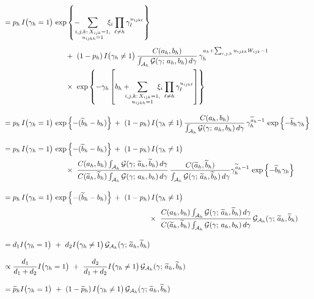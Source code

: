 \documentclass[11pt]{article}
\newcommand{\ind}{I}
\newcommand{\gammaExprUisOne}{ \hspace{3mm} \sum_{\mathclap{\substack{i,j,k{:}\, X_{ijk}=1, \\ u_{ijkh} = 1}}} \hspace{4mm} \xi_i \prod_{\ell \ne h} \gamma_\ell^{ u_{ijk\ell} } }
\begin{document}
\begin{enumerate}[label=Step \arabic*., leftmargin=13mm, itemsep=10mm]
\begin{align*}
&= p_h\, \ind\big( \gamma_h = 1 \big)\, \exp\left\{ -\gammaExprUisOne \right\} \\[1ex]
& \hspace{30mm} +~ (1 - p_h)\, \ind\big(\gamma_h \ne 1 \big)\, \frac{ C(a_h,b_h) }{ \int_{\mathcal{A}_h} \mathcal{G}(\gamma;\, a_h,b_h)\, d\gamma }\, \gamma_h^{ a_h + \sum_{i,j,k} u_{ijkh} W_{ijk} - 1 } \\
& \hspace{30mm} \times~ \exp\left\{ -\gamma_h \left[ b_h + \gammaExprUisOne  \right] \right\} \\[2ex]
&= p_h\, \ind\big( \gamma_h = 1 \big)\, \exp\left\{ -(\widetilde{b}_h - b_h) \right\} \,+~ (1 - p_h)\, \ind\big( \gamma_h \ne 1 \big)\, \frac{ C(a_h,b_h) }{ \int_{\mathcal{A}_h} \mathcal{G}(\gamma;\, a_h,b_h)\, d\gamma }\, \gamma_h^{ \widetilde{a}_h - 1 }\, \exp\left\{ -\widetilde{b}_h \gamma_h \right\} \\[2ex]
&= p_h\, \ind\big( \gamma_h = 1 \big)\, \exp\left\{ -(\widetilde{b}_h - b_h) \right\} \,+~ (1 - p_h)\, \ind\big( \gamma_h \ne 1 \big) \\
& \hspace{30mm} \times~ \frac{ C(a_h,b_h) \int_{\mathcal{A}_h} \mathcal{G}(\gamma;\, \widetilde{a}_h, \widetilde{b}_h)\, d\gamma }{ C(\widetilde{a}_h, \widetilde{b}_h) \int_{\mathcal{A}_h} \mathcal{G}(\gamma;\, a_h, b_h)\, d\gamma }\, \frac{ C( \widetilde{a}_h, \widetilde{b}_h) }{ \int_{\mathcal{A}_h} \mathcal{G}(\gamma;\, \widetilde{a}_h, \widetilde{b}_h)\, d\gamma } \gamma_h^{ \widetilde{a}_h - 1 }\, \exp\left\{ -\widetilde{b}_h \gamma_h \right\} \\[2ex]
&= p_h\, \ind\big( \gamma_h = 1 \big)\, \exp\left\{ -(\widetilde{b}_h - b_h) \right\} \,+~ (1 - p_h)\, \ind\big( \gamma_h \ne 1 \big)\, \\
& \hspace{70mm} \times~ \frac{ C(a_h,b_h) \int_{\mathcal{A}_h} \mathcal{G}(\gamma;\, \widetilde{a}_h, \widetilde{b}_h)\, d\gamma }{ C(\widetilde{a}_h, \widetilde{b}_h) \int_{\mathcal{A}_h} \mathcal{G}(\gamma;\, a_h, b_h)\, d\gamma }\, \mathcal{G}_{\mathcal{A}_h} (\gamma;\, \widetilde{a}_h, \widetilde{b}_h) \\[2ex]
&= d_1 \ind\big( \gamma_h = 1 \big) ~+~ d_2 \ind\big( \gamma_h \ne 1 \big)\, \mathcal{G}_{\mathcal{A}_h} (\gamma;\, \widetilde{a}_h, \widetilde{b}_h) \\[2ex]
&\propto \frac{ d_1 }{ d_1 + d_2 } \ind\big( \gamma_h = 1 \big) ~+~ \frac{ d_2 }{ d_1 + d_2 } \ind\big( \gamma_h \ne 1 \big)\, \mathcal{G}_{\mathcal{A}_h} (\gamma;\, \widetilde{a}_h, \widetilde{b}_h) \\[2ex]
&= \widetilde{p}_h \ind\big( \gamma_h = 1 \big) ~+~ (1 - \widetilde{p}_h)\, \ind\big( \gamma_h \ne 1 \big)\, \mathcal{G}_{\mathcal{A}_h} (\gamma;\, \widetilde{a}_h, \widetilde{b}_h) 
\end{align*} 



\end{enumerate}
\end{document}
